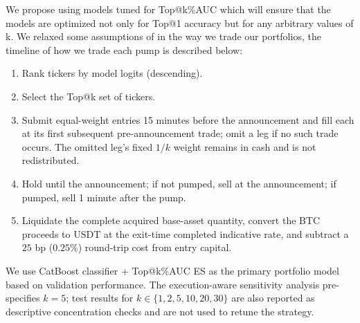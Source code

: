 \documentclass{ieeeaccess}
\begin{document}
We propose using models tuned for Top@k\%AUC which will ensure that the models are optimized not only for Top@1 accuracy but for any arbitrary values of k. We relaxed some assumptions of \cite{pd_anatomy} in the way we trade our portfolios, the timeline of how we trade each pump is described below:

\begin{enumerate}
  \item Rank tickers by model logits (descending).
  \item Select the Top@k set of tickers.
  \item Submit equal-weight entries 15 minutes before the announcement and fill each at its first subsequent pre-announcement trade; omit a leg if no such trade occurs. The omitted leg's fixed $1/k$ weight remains in cash and is not redistributed.
  \item Hold until the announcement; if not pumped, sell at the announcement; if pumped, sell 1 minute after the pump.
  \item Liquidate the complete acquired base-asset quantity, convert the BTC proceeds to USDT at the exit-time completed indicative rate, and subtract a $25$ bp ($0.25\%$) round-trip cost from entry capital.
\end{enumerate}



We use CatBoost classifier + Top@k\%AUC ES as the primary portfolio model based on validation performance. The execution-aware sensitivity analysis pre-specifies $k=5$; test results for $k\in\{1,2,5,10,20,30\}$ are also reported as descriptive concentration checks and are not used to retune the strategy.
\end{document}
